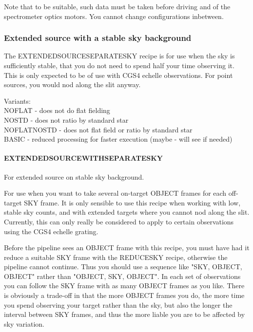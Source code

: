 \documentclass[twoside,11pt]{article}
\renewcommand{\_}{\texttt{\symbol{95}}}
\begin{document}
Note that to be suitable, such data must be taken before driving and
of the spectrometer optics motors. You cannot change configurations
inbetween.


\subsubsection{Extended source with a stable sky background}

The EXTENDED\_SOURCE\_SEPARATE\_SKY recipe is for use when the sky is
sufficiently stable, that you do not need to spend half your time
observing it. This is only expected to be of use with CGS4 echelle
observations. For point sources, you would nod along the slit anyway.

Variants: \\
\_NOFLAT - does not do flat fielding \\
\_NOSTD - does not ratio by standard star \\
\_NOFLAT\_NOSTD - does not flat field or ratio by standard star \\
\_BASIC - reduced processing for faster execution (maybe - will see if needed) \\

\paragraph{EXTENDED\_SOURCE\_WITH\_SEPARATE\_SKY\label{EXTENDED_SOURCE_WITH_SEPARATE_SKY}}

For extended source on stable sky background.


\mbox{}

For use when you want to take several on-target OBJECT frames for each
off-target SKY frame. It is only sensible to use this recipe when
working with low, stable sky counts, and with extended targets where
you cannot nod along the slit. Currently, this can only really be
considered to apply to certain observations using the CGS4 echelle
grating.



Before the pipeline sees an OBJECT frame with this recipe, you must
have had it reduce a suitable SKY frame with the REDUCE\_SKY recipe,
otherwise the pipeline cannot continue. Thus you should use a sequence
like "SKY, OBJECT, OBJECT" rather than "OBJECT, SKY, OBJECT". In each
set of observations you can follow the SKY frame with as many OBJECT
frames as you like. There is obviously a trade-off in that the more
OBJECT frames you do, the more time you spend observing your target
rather than the sky, but also the longer the interval between SKY
frames, and thus the more liable you are to be affected by sky
variation.
\end{document}
